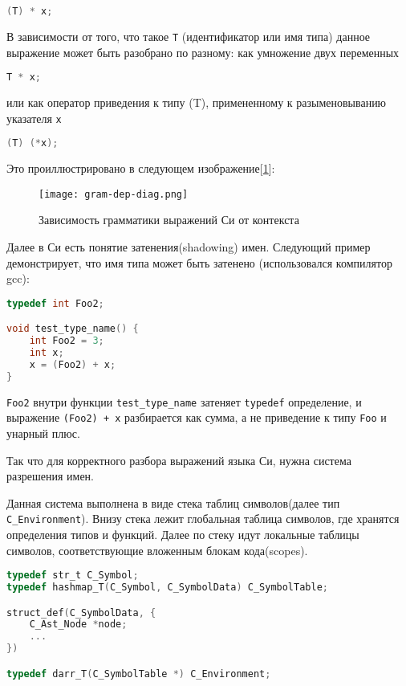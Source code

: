 \begin{lstlisting}[language=c]
(T) * x;
\end{lstlisting}

В зависимости от того, что такое \verb|T| (идентификатор или имя типа) данное выражение может быть разобрано по разному:
как умножение двух переменных
\begin{lstlisting}[language=c]
T * x;
\end{lstlisting}
или как оператор приведения к типу (T), примененному к разыменовыванию указателя \verb|x|
\begin{lstlisting}[language=c]
(T) (*x);
\end{lstlisting}

Это проиллюстрировано в следующем изображение[\ref{parsing:gram-dep-diag}]:
\begin{figure}[h!]
    \texttt{[image: gram-dep-diag.png]}
    \centering
    \caption{Зависимость грамматики выражений Си от контекста}
    \label{parsing:gram-dep-diag}
\end{figure}
\FloatBarrier


Далее в Си есть понятие затенения(shadowing) имен. 
Следующий пример демонстрирует, что имя типа может быть затенено (использовался компилятор gcc):

\begin{lstlisting}[language=c, caption={Пример затенения имен}, label={parsing:name-shadowing-ex}]
typedef int Foo2;

void test_type_name() {
    int Foo2 = 3;
    int x;
    x = (Foo2) + x;
}
\end{lstlisting}

\verb|Foo2| внутри функции \verb|test_type_name| затеняет \verb|typedef| определение, и выражение \verb|(Foo2) + x| разбирается как сумма, 
а не приведение к типу \verb|Foo| и унарный плюс.

Так что для корректного разбора выражений языка Си, нужна система разрешения имен.

Данная система выполнена в виде стека таблиц символов(далее тип \verb|C_Environment|).
Внизу стека лежит глобальная таблица символов, где хранятся определения типов и функций. Далее по стеку идут локальные таблицы символов, соответствующие вложенным блокам кода(scopes).

\begin{lstlisting}[language=c, caption={Определения структур сивола и окружения}, label={parsing:env-struct}]
typedef str_t C_Symbol;
typedef hashmap_T(C_Symbol, C_SymbolData) C_SymbolTable;

struct_def(C_SymbolData, {
    C_Ast_Node *node;
    ...
})

typedef darr_T(C_SymbolTable *) C_Environment;
\end{lstlisting}

